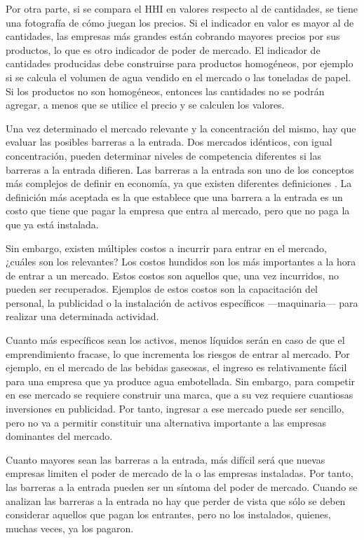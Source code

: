 \documentclass[
  12pt,
  spanish,
]{book}
\begin{document}
Por otra parte, si se compara el HHI en valores respecto al de cantidades, se tiene una fotografía de cómo juegan los precios. Si el indicador en valor es mayor al de cantidades, las empresas más grandes están cobrando mayores precios por sus productos, lo que es otro indicador de poder de mercado. El indicador de cantidades producidas debe construirse para productos homogéneos, por ejemplo si se calcula el volumen de agua vendido en el mercado o las toneladas de papel. Si los productos no son homogéneos, entonces las cantidades no se podrán agregar, a menos que se utilice el precio y se calculen los valores.

Una vez determinado el mercado relevante y la concentración del mismo, hay que evaluar las posibles barreras a la entrada. Dos mercados idénticos, con igual concentración, pueden determinar niveles de competencia diferentes si
las barreras a la entrada difieren. Las barreras a la entrada son uno de los conceptos más complejos de definir en economía, ya que existen diferentes definiciones \citep{McAfee2004}. La definición más aceptada es la que establece que una barrera a la entrada es un costo que tiene que pagar la empresa que entra al mercado, pero que no paga la que ya está instalada.

Sin embargo, existen múltiples costos a incurrir para entrar en el mercado, ¿cuáles son los relevantes? Los costos hundidos son los más importantes a la hora de entrar a un mercado. Estos costos son aquellos que, una vez incurridos, no pueden ser recuperados. Ejemplos de estos costos son la capacitación del personal, la publicidad o la instalación de activos específicos ---maquinaria--- para realizar una determinada actividad.

Cuanto más específicos sean los activos, menos líquidos serán en caso de que el emprendimiento fracase, lo que incrementa los riesgos de entrar al mercado. Por ejemplo, en el mercado de las bebidas gaseosas, el ingreso es relativamente fácil para una empresa que ya produce agua embotellada. Sin embargo, para competir en ese mercado se requiere construir una marca, que a su vez requiere cuantiosas inversiones en publicidad. Por tanto, ingresar a ese mercado puede ser sencillo, pero no va a permitir constituir una alternativa importante a las empresas dominantes del mercado.

Cuanto mayores sean las barreras a la entrada, más difícil será que nuevas empresas limiten el poder de mercado de la o las empresas instaladas. Por tanto, las barreras a la entrada pueden ser un síntoma del poder de mercado.
Cuando se analizan las barreras a la entrada no hay que perder de vista que sólo se deben considerar aquellos que pagan los entrantes, pero no los instalados, quienes, muchas veces, ya los pagaron.
\end{document}
